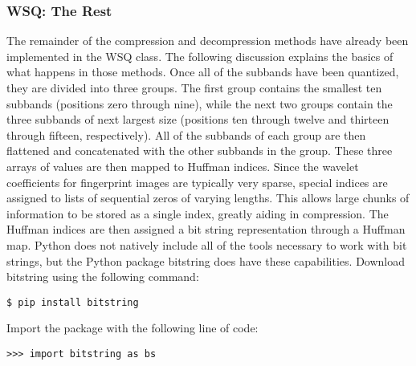 \subsubsection*{WSQ: The Rest}
The remainder of the compression and decompression methods have already been implemented in the WSQ class.
The following discussion explains the basics of what happens in those methods.
Once all of the subbands have been quantized, they are divided into three groups.
The first group contains the smallest ten subbands (positions zero through nine), while the next two groups contain the three subbands of next largest size (positions ten through twelve and
thirteen through fifteen, respectively).
All of the subbands of each group are then flattened and concatenated with the other subbands in the group.
These three arrays of values are then mapped to Huffman indices.
Since the wavelet coefficients for fingerprint images are typically very sparse, special indices are assigned to lists of sequential zeros of varying lengths.
This allows large chunks of information to be stored as a single index, greatly aiding in compression.
The Huffman indices are then assigned a bit string representation through a Huffman map.
Python does not natively include all of the tools necessary to work with bit strings, but the Python package bitstring does have these capabilities.
Download bitstring using the following command:
\begin{lstlisting}
$ pip install bitstring
\end{lstlisting}
Import the package with the following line of code:
\begin{lstlisting}
>>> import bitstring as bs
\end{lstlisting}


